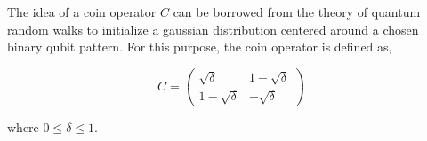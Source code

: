The idea of a coin operator $C$ can be borrowed from the theory of quantum random walks to initialize a gaussian distribution centered around a chosen binary qubit pattern. For this purpose, the coin operator is defined as,

\begin{equation}
C = \begin{pmatrix}
\sqrt{\delta} & 1-\sqrt{\delta} \\
1-\sqrt{\delta} & -\sqrt{\delta}
\end{pmatrix}
\end{equation}

where $0 \leq \delta \leq 1$.